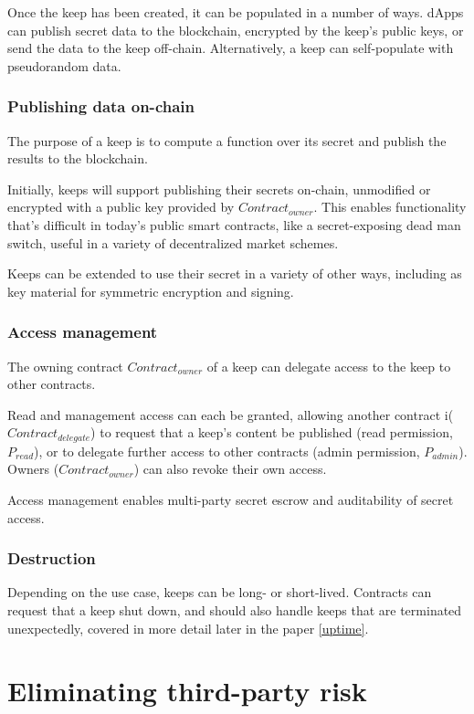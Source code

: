 \documentclass[11pt]{article}
\begin{document}
Once the keep has been created, it can be populated in a number of
ways. dApps can publish secret data to the blockchain, encrypted by
the keep's public keys, or send the data to the keep off-chain.
Alternatively, a keep can self-populate with pseudorandom data.

\subsubsection{Publishing data on-chain}

The purpose of a keep is to compute a function over its secret and
publish the results to the blockchain.

Initially, keeps will support publishing their secrets on-chain,
unmodified or encrypted with a public key provided by
$Contract_{owner}$. This enables functionality that's difficult in
today's public smart contracts, like a secret-exposing dead man
switch, useful in a variety of decentralized market schemes.

Keeps can be extended to use their secret in a variety of other ways,
including as key material for symmetric encryption and signing.

\subsubsection{Access management}

The owning contract $Contract_{owner}$ of a keep can delegate access
to the keep to other contracts.

Read and management access can each be granted, allowing another
contract i($Contract_{delegate}$) to request that a keep's content be
published (read permission, $P_{read}$), or to delegate further access
to other contracts (admin permission, $P_{admin}$). Owners
($Contract_{owner}$) can also revoke their own access.

Access management enables multi-party secret escrow and auditability
of secret access.

\subsubsection{Destruction}

Depending on the use case, keeps can be long- or short-lived.
Contracts can request that a keep shut down, and should also handle
keeps that are terminated unexpectedly, covered in more detail later
in the paper \ref{uptime}.

\section{Eliminating third-party risk} \label{eliminatingRisk}
\end{document}
